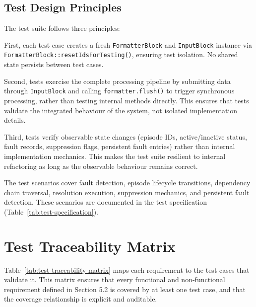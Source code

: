 \subsection{Test Design Principles}

The test suite follows three principles:

First, each test case creates a fresh \texttt{FormatterBlock} and \texttt{InputBlock} instance via \texttt{FormatterBlock::resetIdsForTesting()}, ensuring test isolation. No shared state persists between test cases.

Second, tests exercise the complete processing pipeline by submitting data through \texttt{InputBlock} and calling \texttt{formatter.flush()} to trigger synchronous processing, rather than testing internal methods directly. This ensures that tests validate the integrated behaviour of the system, not isolated implementation details.

Third, tests verify observable state changes (episode IDs, active/inactive status, fault records, suppression flags, persistent fault entries) rather than internal implementation mechanics. This makes the test suite resilient to internal refactoring as long as the observable behaviour remains correct.

The test scenarios cover fault detection, episode lifecycle transitions, dependency chain traversal, resolution execution, suppression mechanics, and persistent fault detection. These scenarios are documented in the test specification (Table~\ref{tab:test-specification}).
\FloatBarrier
\section{Test Traceability Matrix}\label{sec:test-traceability}

Table~\ref{tab:test-traceability-matrix} maps each requirement to the test cases that validate it. This matrix ensures that every functional and non-functional requirement defined in Section 5.2 is covered by at least one test case, and that the coverage relationship is explicit and auditable.

